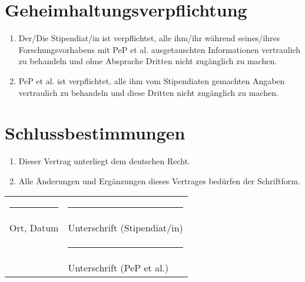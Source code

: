 \documentclass[
  paper=a4,
  fontsize=12pt,
  DIV=16,
  parskip=full,
  headinclude=true,
]{scrartcl}
\begin{document}
\section{Geheimhaltungsverpflichtung}

\begin{enumerate}[\qquad(1)]
  \item Der/Die Stipendiat/in ist verpflichtet, alle ihm/ihr während
    seines/ihres Forschungsvorhabens mit PeP et al. ausgetauschten
    Informationen vertraulich zu behandeln und ohne Absprache
    Dritten nicht zugänglich zu machen.
  \item PeP et al. ist verpflichtet, alle ihm vom Stipendiaten gemachten
    Angaben vertraulich zu behandeln und diese Dritten nicht
    zugänglich zu machen.
\end{enumerate}

\newpage
\section{Schlussbestimmungen}

\begin{enumerate}[\qquad(1)]
  \item Dieser Vertrag unterliegt dem deutschen Recht.
  \item Alle Änderungen und Ergänzungen dieses Vertrages bedürfen der
    Schriftform.
\end{enumerate}

\vspace{2cm}
\begin{tabular}{@{}p{}@{}p{}@{}}%
\rule{6cm}{1pt} & \rule{7cm}{1pt} \\
Ort, Datum & Unterschrift (Stipendiat/in)\\[2cm]
 & \rule{7cm}{1pt} \\
 & Unterschrift (PeP et al.)
\end{tabular}
\end{document}
